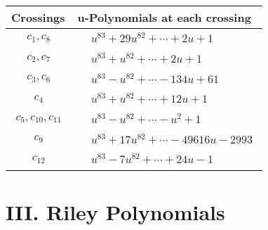 \documentclass[1p]{elsarticle_modified}
\theoremstyle{definition}
\begin{document}
\begin{tabular}{m{50pt}|m{274pt}}
Crossings & \hspace{64pt}u-Polynomials at each crossing \\
\hline $$\begin{aligned}c_{1},c_{8}\end{aligned}$$&$\begin{aligned}
&u^{83}+29 u^{82}+\cdots+2 u+1
\end{aligned}$\\
\hline $$\begin{aligned}c_{2},c_{7}\end{aligned}$$&$\begin{aligned}
&u^{83}+u^{82}+\cdots+2 u+1
\end{aligned}$\\
\hline $$\begin{aligned}c_{3},c_{6}\end{aligned}$$&$\begin{aligned}
&u^{83}- u^{82}+\cdots-134 u+61
\end{aligned}$\\
\hline $$\begin{aligned}c_{4}\end{aligned}$$&$\begin{aligned}
&u^{83}+u^{82}+\cdots+12 u+1
\end{aligned}$\\
\hline $$\begin{aligned}c_{5},c_{10},c_{11}\end{aligned}$$&$\begin{aligned}
&u^{83}- u^{82}+\cdots- u^2+1
\end{aligned}$\\
\hline $$\begin{aligned}c_{9}\end{aligned}$$&$\begin{aligned}
&u^{83}+17 u^{82}+\cdots-49616 u-2993
\end{aligned}$\\
\hline $$\begin{aligned}c_{12}\end{aligned}$$&$\begin{aligned}
&u^{83}-7 u^{82}+\cdots+24 u-1
\end{aligned}$\\
\hline
\end{tabular}\newpage\renewcommand{\arraystretch}{1}
\centering \section*{ III. Riley Polynomials}
\end{document}
